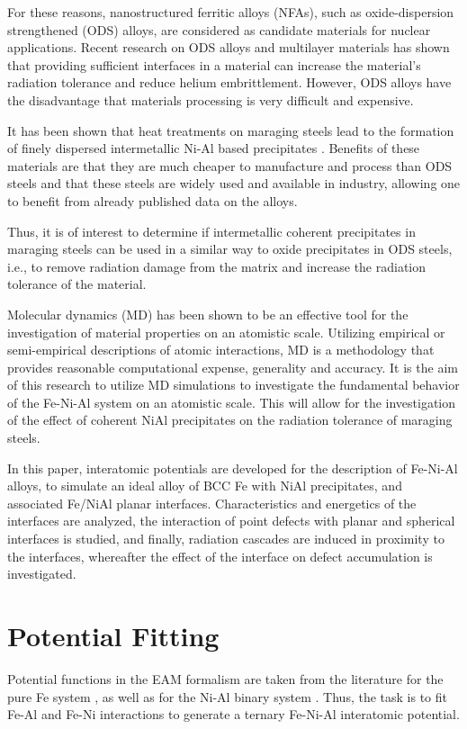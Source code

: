 \documentclass[review]{elsarticle}
\begin{document}
For these reasons, nanostructured ferritic alloys (NFAs), such as oxide-dispersion strengthened (ODS) alloys, are considered as candidate materials for nuclear applications.  Recent research on ODS alloys and multilayer materials has shown that providing sufficient interfaces in a material can increase the material's radiation tolerance and reduce helium embrittlement.  However, ODS alloys have the disadvantage that materials processing is very difficult and expensive.  

It has been shown that heat treatments on maraging steels lead to the formation of finely dispersed intermetallic Ni-Al based precipitates \cite{decker1988,stiller2008,schnitzer2010}.  Benefits of these materials are that they are much cheaper to manufacture and process than ODS steels and that these steels are widely used and available in industry, allowing one to benefit from already published data on the alloys.  

Thus, it is of interest to determine if intermetallic coherent precipitates in maraging steels can be used in a similar way to oxide precipitates in ODS steels, i.e., to remove radiation damage from the matrix and increase the radiation tolerance of the material.  

Molecular dynamics (MD) has been shown to be an effective tool for the investigation of material properties on an atomistic scale.  Utilizing empirical or semi-empirical descriptions of atomic interactions, MD is a methodology that provides reasonable computational expense, generality and accuracy.  It is the aim of this research to utilize MD simulations to investigate the fundamental behavior of the Fe-Ni-Al system on an atomistic scale.  This will allow for the investigation of the effect of coherent NiAl precipitates on the radiation tolerance of maraging steels.

In this paper, interatomic potentials are developed for the description of Fe-Ni-Al alloys, to simulate an ideal alloy of BCC Fe with NiAl precipitates, and associated Fe/NiAl planar interfaces.  Characteristics and energetics of the interfaces are analyzed, the interaction of point defects with planar and spherical interfaces is studied, and finally, radiation cascades are induced in proximity to the interfaces, whereafter the effect of the interface on defect accumulation is investigated.


\section{Potential Fitting}
Potential functions in the EAM \cite{daw1984} formalism are taken from the literature for the pure Fe system \cite{mendelev2003}, as well as for the Ni-Al binary system \cite{pun2009}.  Thus, the task is to fit Fe-Al and Fe-Ni interactions to generate a ternary Fe-Ni-Al interatomic potential.  
\end{document}
